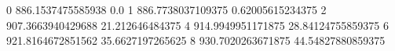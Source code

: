 0 886.1537475585938 0.0
1 886.7738037109375 0.62005615234375
2 907.3663940429688 21.212646484375
4 914.9949951171875 28.84124755859375
6 921.8164672851562 35.6627197265625
8 930.7020263671875 44.54827880859375
